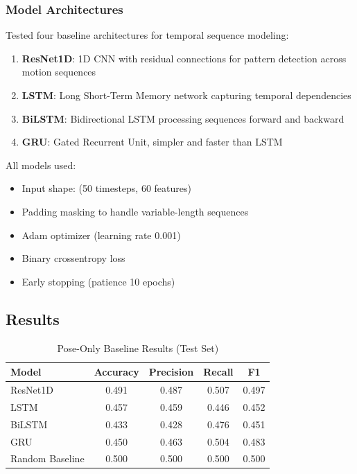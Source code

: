 \documentclass[12pt,a4paper]{article}
\begin{document}
\subsubsection{Model Architectures}

Tested four baseline architectures for temporal sequence modeling:

\begin{enumerate}
\item \textbf{ResNet1D}: 1D CNN with residual connections for pattern detection across motion sequences
\item \textbf{LSTM}: Long Short-Term Memory network capturing temporal dependencies
\item \textbf{BiLSTM}: Bidirectional LSTM processing sequences forward and backward
\item \textbf{GRU}: Gated Recurrent Unit, simpler and faster than LSTM
\end{enumerate}

All models used:
\begin{itemize}
\item Input shape: (50 timesteps, 60 features)
\item Padding masking to handle variable-length sequences
\item Adam optimizer (learning rate 0.001)
\item Binary crossentropy loss
\item Early stopping (patience 10 epochs)
\end{itemize}

\subsection{Results}

\begin{table}[H]
\centering
\caption{Pose-Only Baseline Results (Test Set)}
\begin{tabular}{lcccc}
\toprule
Model & Accuracy & Precision & Recall & F1 \\
\midrule
ResNet1D & 0.491 & 0.487 & 0.507 & 0.497 \\
LSTM & 0.457 & 0.459 & 0.446 & 0.452 \\
BiLSTM & 0.433 & 0.428 & 0.476 & 0.451 \\
GRU & 0.450 & 0.463 & 0.504 & 0.483 \\
\midrule
Random Baseline & 0.500 & 0.500 & 0.500 & 0.500 \\
\bottomrule
\end{tabular}
\end{table}
\end{document}
